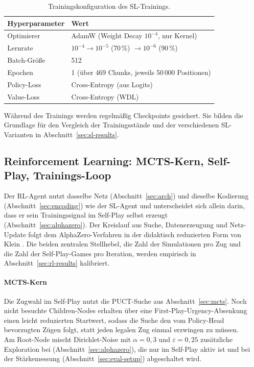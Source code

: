 \documentclass[
  a4paper, 12pt,
  parskip=half,
  headings=small,
  bibliography=totoc
]{scrartcl}
\begin{document}
\begin{table}[htbp]
  \centering
  \begin{tabular}{ll}
    \toprule
    Hyperparameter & Wert \\
    \midrule
    Optimierer     & AdamW (Weight Decay \(10^{-4}\), nur Kernel) \\
    Lernrate       & \(10^{-4} \to 10^{-5}\) (70\,\%) \(\to 10^{-6}\) (90\,\%) \\
    Batch-Größe    & 512 \\
    Epochen        & 1 (über 469 Chunks, jeweils 50\,000 Positionen)\\
    Policy-Loss & Cross-Entropy (aus Logits) \\
    Value-Loss  & Cross-Entropy (WDL) \\
    \bottomrule
  \end{tabular}
  \caption{Trainingskonfiguration des SL-Trainings.}
  \label{tab:sl-train}
\end{table}

Während des Trainings werden regelmäßig Checkpoints gesichert. Sie bilden die
Grundlage für den Vergleich der Trainingsstände und der verschiedenen
SL-Varianten in Abschnitt~\ref{sec:sl-results}.

\subsection{Reinforcement Learning: MCTS-Kern, Self-Play, Trainings-Loop}\label{sec:rl-impl} %
Der RL-Agent nutzt dasselbe Netz (Abschnitt~\ref{sec:arch}) und dieselbe Kodierung (Abschnitt~\ref{sec:encoding}) wie der SL-Agent und unterscheidet sich allein darin, dass er sein Trainingssignal im Self-Play selbst erzeugt (Abschnitt~\ref{sec:alphazero}). Der Kreislauf aus Suche, Datenerzeugung und Netz-Update folgt dem AlphaZero-Verfahren \autocite{silver2018} in der didaktisch reduzierten Form von Klein \autocite{klein2022neural}. Die beiden zentralen Stellhebel, die Zahl der Simulationen pro Zug und die Zahl der Self-Play-Games pro Iteration, werden empirisch in Abschnitt~\ref{sec:rl-results} kalibriert.

\paragraph{MCTS-Kern}
Die Zugwahl im Self-Play nutzt die PUCT-Suche aus Abschnitt~\ref{sec:mcts}. Noch nicht besuchte Children-Nodes erhalten über eine First-Play-Urgency-Absenkung einen leicht reduzierten Startwert, sodass die Suche den vom Policy-Head bevorzugten Zügen folgt, statt jeden legalen Zug einmal erzwingen zu müssen. Am Root-Node mischt Dirichlet-Noise mit \(\alpha = 0{,}3\) und \(\varepsilon = 0{,}25\) zusätzliche Exploration bei (Abschnitt~\ref{sec:alphazero}), die nur im Self-Play aktiv ist und bei der Stärkemessung (Abschnitt~\ref{sec:eval-setup}) abgeschaltet wird.
\end{document}
